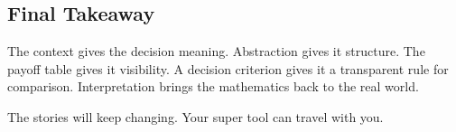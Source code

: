 	
	
	\subsection{Final Takeaway}
	\label{sec:final-takeaway}
	\begin{bigidea}
		\centering\large
		The context gives the decision meaning. Abstraction gives it structure. The
		payoff table gives it visibility. A decision criterion gives it a transparent
		rule for comparison. Interpretation brings the mathematics back to the real
		world.
	\end{bigidea}
	
	The stories will keep changing. Your super tool can travel with you.
	
	

